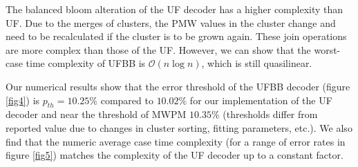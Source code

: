 \documentclass[11pt, a4paper, twoside, titlepage ,dvipsnames]{report}
\begin{document}


The balanced bloom alteration of the UF decoder has a higher complexity than UF. Due to the merges of clusters, the PMW values in the cluster change and need to be recalculated if the cluster is to be grown again. These join operations are more complex than those of the UF. However, we can show that the worst-case time complexity of UFBB is $\mathcal{O}(n \log n)$, which is still quasilinear.

Our numerical results show that the error threshold of the UFBB decoder (figure \ref{fig4}) is $p_{th} = 10.25\%$ compared to $10.02\%$ for our implementation of the UF decoder and near the threshold of MWPM $10.35\%$ (thresholds differ from reported value due to changes in cluster sorting, fitting parameters, etc.). We also find that the numeric average case time complexity (for a range of error rates in figure \ref{fig5}) matches the complexity of the UF decoder up to a constant factor.
\end{document}
